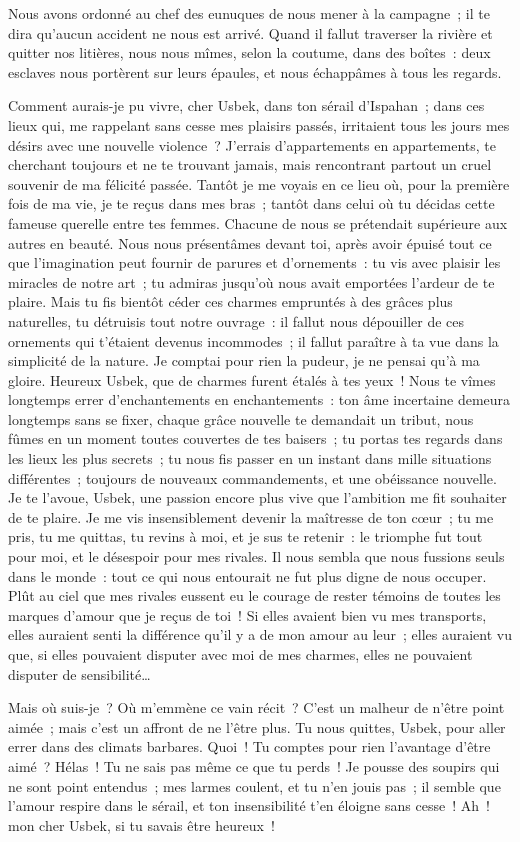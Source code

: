 \documentclass[french,twoside]{book} %
\begin{document}
\noindent Nous avons ordonné au chef des eunuques de nous mener à la campagne ; il te dira qu’aucun accident ne nous est arrivé. Quand il fallut traverser la rivière et quitter nos litières, nous nous mîmes, selon la coutume, dans des boîtes : deux esclaves nous portèrent sur leurs épaules, et nous échappâmes à tous les regards.\par
Comment aurais-je pu vivre, cher Usbek, dans ton sérail d’Ispahan ; dans ces lieux qui, me rappelant sans cesse mes plaisirs passés, irritaient tous les jours mes désirs avec une nouvelle violence ? J’errais d’appartements en appartements, te cherchant toujours et ne te trouvant jamais, mais rencontrant partout un cruel souvenir de ma félicité passée. Tantôt je me voyais en ce lieu où, pour la première fois de ma vie, je te reçus dans mes bras ; tantôt dans celui où tu décidas cette fameuse querelle entre tes femmes. Chacune de nous se prétendait supérieure aux autres en beauté. Nous nous présentâmes devant toi, après avoir épuisé tout ce que l’imagination peut fournir de parures et d’ornements : tu vis avec plaisir les miracles de notre art ; tu admiras jusqu’où nous avait emportées l’ardeur de te plaire. Mais tu fis bientôt céder ces charmes empruntés à des grâces plus naturelles, tu détruisis tout notre ouvrage : il fallut nous dépouiller de ces ornements qui t’étaient devenus incommodes ; il fallut paraître à ta vue dans la simplicité de la nature. Je comptai pour rien la pudeur, je ne pensai qu’à ma gloire. Heureux Usbek, que de charmes furent étalés à tes yeux ! Nous te vîmes longtemps errer d’enchantements en enchantements : ton âme incertaine demeura longtemps sans se fixer, chaque grâce nouvelle te demandait un tribut, nous fûmes en un moment toutes couvertes de tes baisers ; tu portas tes regards dans les lieux les plus secrets ; tu nous fis passer en un instant dans mille situations différentes ; toujours de nouveaux commandements, et une obéissance nouvelle. Je te l’avoue, Usbek, une passion encore plus vive que l’ambition me fit souhaiter de te plaire. Je me vis insensiblement devenir la maîtresse de ton cœur ; tu me pris, tu me quittas, tu revins à moi, et je sus te retenir : le triomphe fut tout pour moi, et le désespoir pour mes rivales. Il nous sembla que nous fussions seuls dans le monde : tout ce qui nous entourait ne fut plus digne de nous occuper. Plût au ciel que mes rivales eussent eu le courage de rester témoins de toutes les marques d’amour que je reçus de toi ! Si elles avaient bien vu mes transports, elles auraient senti la différence qu’il y a de mon amour au leur ; elles auraient vu que, si elles pouvaient disputer avec moi de mes charmes, elles ne pouvaient disputer de sensibilité…\par
Mais où suis-je ? Où m’emmène ce vain récit ? C’est un malheur de n’être point aimée ; mais c’est un affront de ne l’être plus. Tu nous quittes, Usbek, pour aller errer dans des climats barbares. Quoi ! Tu comptes pour rien l’avantage d’être aimé ? Hélas ! Tu ne sais pas même ce que tu perds ! Je pousse des soupirs qui ne sont point entendus ; mes larmes coulent, et tu n’en jouis pas ; il semble que l’amour respire dans le sérail, et ton insensibilité t’en éloigne sans cesse ! Ah ! mon cher Usbek, si tu savais être heureux !\par
\end{document}
